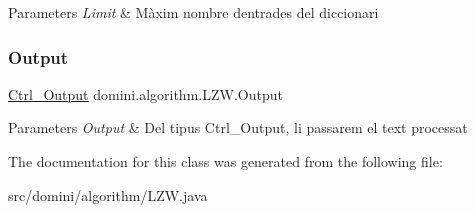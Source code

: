 \begin{DoxyParams}{Parameters}
{\em Limit} & Màxim nombre d\textquotesingle{}entrades del diccionari \\
\hline
\end{DoxyParams}
\mbox{\label{classdomini_1_1algorithm_1_1LZW_a22cd522a89b5226a3fb3424ffe122f72}} 
\subsubsection{\texorpdfstring{Output}{Output}}
{\footnotesize\ttfamily \hyperlink{classpersistencia_1_1output_1_1Ctrl__Output}{Ctrl\+\_\+\+Output} domini.\+algorithm.\+L\+Z\+W.\+Output\hspace{0.3cm}{\ttfamily [package]}}


\begin{DoxyParams}{Parameters}
{\em Output} & Del tipus Ctrl\+\_\+\+Output, li passarem el text processat \\
\hline
\end{DoxyParams}


The documentation for this class was generated from the following file\+:\begin{DoxyCompactItemize}
\item 
src/domini/algorithm/L\+Z\+W.\+java\end{DoxyCompactItemize}
